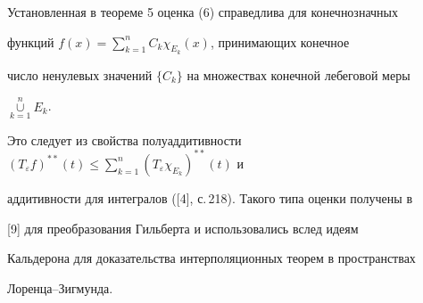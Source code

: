

 


\begin{notenonum} 


Установленная в теореме 5 оценка (6) справедлива для конечнозначных 


функций $f(x)=\sum\limits^n_{k=1}C_k\chi_{E_k}(x)$, принимающих конечное


число ненулевых значений $\{C_k\}$ на множествах конечной лебеговой меры 


$\mathop{\cup}\limits^n_{k=1}E_k$. 


Это следует из свойства полуаддитивности $(T_\varepsilon 


f)^{*{*}}(t)\le \sum\limits^n_{k=1}(T_\varepsilon\chi_{E_k})^{*{*}}(t)$ и 


аддитивности для интегралов ([4], с.\,218). Такого типа оценки получены в 


[9] для преобразования Гильберта и использовались вслед идеям 


Кальдерона для доказательства интерполяционных теорем в пространствах 


Лоренца--Зигмунда. 


\end{notenonum} 


